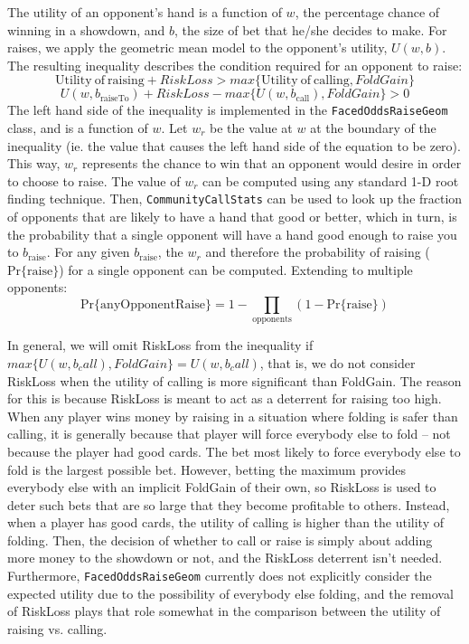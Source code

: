The utility of an opponent's hand is a function of $w$, the percentage chance of winning in a showdown, and $b$, the size of bet that he/she decides to make.
For raises, we apply the geometric mean model to the opponent's utility, $U(w,b)$.
The resulting inequality describes the condition required for an opponent to raise:
\[
\mathrm{Utility\:of\:raising} + RiskLoss > max\{\mathrm{Utility\:of\:calling}, FoldGain\}
\]
\[
U(w,b_\mathrm{raiseTo}) + RiskLoss - max\{U(w,b_\mathrm{call}), FoldGain\} > 0
\]
The left hand side of the inequality is implemented in the \texttt{FacedOddsRaiseGeom} class, and is a function of $w$.
Let $w_r$ be the value at $w$ at the boundary of the inequality (ie. the value that causes the left hand side of the equation to be zero).
This way, $w_r$ represents the chance to win that an opponent would desire in order to choose to raise.
The value of $w_r$ can be computed using any standard 1-D root finding technique.
Then, \texttt{CommunityCallStats} can be used to look up the fraction of opponents that are likely to have a hand that good or better, which in turn, is the probability that a single opponent will have a hand good enough to raise you to $b_\mathrm{raise}$.
For any given $b_\mathrm{raise}$, the $w_r$ and therefore the probability of raising ($\mathrm{Pr\{raise\}}$) for a single opponent can be computed.
Extending to multiple opponents:
\[
\mathrm{Pr\{anyOpponentRaise\}} = 1 - \prod_\mathrm{opponents} \left( 1 - \mathrm{Pr\{raise\}} \right)
\]


In general, we will omit RiskLoss from the inequality if $max\{U(w,b_call), FoldGain\} = U(w,b_call)$, that is, we do not consider RiskLoss when the utility of calling is more significant than FoldGain.
The reason for this is because RiskLoss is meant to act as a deterrent for raising too high.
When any player wins money by raising in a situation where folding is safer than calling, it is generally because that player will force everybody else to fold -- not because the player had good cards.
The bet most likely to force everybody else to fold is the largest possible bet.
However, betting the maximum provides everybody else with an implicit FoldGain of their own, so RiskLoss is used to deter such bets that are so large that they become profitable to others.
Instead, when a player has good cards, the utility of calling is higher than the utility of folding.
Then, the decision of whether to call or raise is simply about adding more money to the showdown or not, and the RiskLoss deterrent isn't needed.
Furthermore, \texttt{FacedOddsRaiseGeom} currently does not explicitly consider the expected utility due to the possibility of everybody else folding, and the removal of RiskLoss plays that role somewhat in the comparison between the utility of raising vs. calling.

